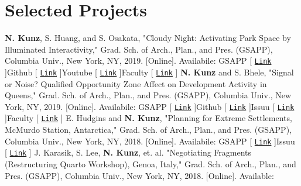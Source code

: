 \documentclass{article}
\begin{document}
    \section*{Selected Projects}
        \textbf{N. Kunz}, S. Huang, and S. Osakata, "Cloudy Night: Activating Park Space by Illuminated Interactivity," Grad. Sch. of Arch., Plan., and Pres. (GSAPP), Columbia Univ., New York, NY, 2019. [Online]. Availabile:\newline\newline
        \faTrain\space GSAPP [ \href{https://www.arch.columbia.edu/student-work/7502-cloudy-night}{\texttt{Link}} ]\space\faGithub\space Github [ \href{https://github.com/nickkunz/cloudynight}{\texttt{Link}} ]\space\space \faYoutube\space Youtube [ \href{https://www.youtube.com/watch?v=GWaXrN79Lbw&feature=emb_title}{\texttt{Link}} ]\space\faCertificate\space Faculty [ \href{https://edblogs.columbia.edu/plana6102-001-2019-1/2019/05/10/cloudy-night-activating-park-space-by-illuminated-interactivity-2/}{\texttt{Link}} ]\newline\newline
        \textbf{N. Kunz} and S. Bhele, "Signal or Noise? Qualified Opportunity Zone Affect on Development Activity in Queens," Grad. Sch. of Arch., Plan., and Pres. (GSAPP), Columbia Univ., New York, NY, 2019. [Online]. Availabile:\newline\newline
        \faTrain\space GSAPP [ \href{https://cdn.filepicker.io/api/file/guXiVLU6QreQgKPPPUG8?&fit=max}{\texttt{Link}} ]\space\faGithub\space Github [ \href{https://github.com/nickkunz/queens-dbscan}{\texttt{Link}} ]\space\faBook\space Issuu [ \href{https://issuu.com/nickkunz/docs/queens_report}{\texttt{Link}} ]\space\faCertificate\space Faculty [ \href{https://www.leahmeisterlin.com/advanced-spatial-analysis-2019}{\texttt{Link}} ]\newline\newline
        E. Hudgins and \textbf{N. Kunz}, "Planning for Extreme Settlements, McMurdo Station, Antarctica," Grad. Sch. of Arch., Plan., and Pres. (GSAPP), Columbia Univ., New York, NY, 2018. [Online]. Availabile:\newline\newline
        \faTrain\space GSAPP [ \href{https://www.arch.columbia.edu/student-work/5461}{\texttt{Link}} ]\space\faBook\space Issuu [ \href{https://issuu.com/nickkunz/docs/mcmurdo}{\texttt{Link}} ]\newline\newline
        J. Karasik, S. Lee, \textbf{N. Kunz}, et. al. "Negotiating Fragments (Restructuring Quarto Workshop), Genoa, Italy," Grad. Sch. of Arch., Plan., and Pres. (GSAPP), Columbia Univ., New York, NY, 2018. [Online]. Available:\newline\newline
\end{document}
